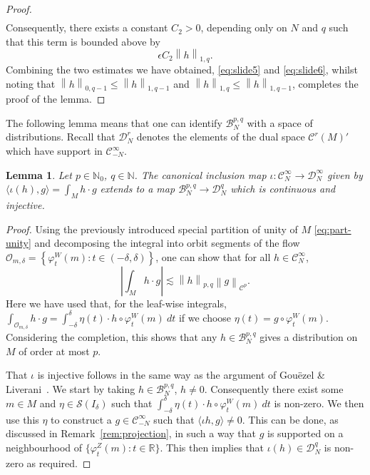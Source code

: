 \documentclass[a4paper,11pt]{amsart}
\newtheorem{lemma}[theorem]{Lemma}
\theoremstyle{remark}
\newcommand{\abs}[1]{\left|#1\right|} %
\newcommand{\cB}{\mathcal{B}} %
\newcommand{\cC}{\mathcal{C}} %
\newcommand{\cD}{\mathcal{D}} %
\newcommand{\cS}{\mathcal{S}} %
\newcommand{\bN}{\mathbb{N}} %
\newcommand{\bR}{\mathbb{R}} %
\newcommand{\norm}[1]{\left\|#1\right\|} %
\newcommand{\dw}{W} %
\newcommand{\dz}{Z} %
\begin{document}
\begin{proof}
\begin{multline*}
    \end{multline*}
    Consequently, there exists a constant \(C_2>0\), depending only on \(N\) and \(q\) such that this term is bounded above by
    \begin{equation}
        \label{eq:slide6}
        \epsilon C_2 \norm{h}_{1,q}.
    \end{equation}
    Combining the two estimates we have obtained, \eqref{eq:slide5} and \eqref{eq:slide6}, whilst noting that \(\norm{h}_{0,q-1} \leq \norm{h}_{1,q-1}\) and \(\norm{h}_{1,q} \leq \norm{h}_{1,q-1}\), completes the proof of the lemma.
\end{proof}

The following lemma means that one can identify \(\cB_{N}^{p,q}\) with a space of distributions. 
Recall that \(\cD_{N}^{r}\) denotes the elements of the dual space \({\cC^{r}(M)}'\) which have support in \(\cC_{-N}^{\infty}\).

\begin{lemma}
    \label{lem:distributions}
    Let \(p \in \bN_0\), \(q \in \bN\).
    The canonical inclusion map \(\iota:\cC^\infty_{N} \rightarrow \cD_{N}^{\infty}\) given by \(\langle \iota(h), g \rangle =  \int_{M} h \cdot g \) extends to a map \(\cB_{N}^{p,q} \to \cD_{N}^{q}\) which is continuous and injective.
\end{lemma}

\begin{proof}
    Using the previously introduced special partition of unity of \(M\) \eqref{eq:part-unity} and decomposing the integral into orbit segments of the flow \(\mathcal{O}_{m,\delta} = \left\{\varphi_t^\dw(m) : t\in (-\delta,\delta) \right\}\), one can show that for all \(h\in \cC_N^\infty\),
    \[
        \abs{\int_{M} h \cdot g} \lesssim \norm{h}_{p,q} \norm{g}_{\cC^p}.
    \]
    Here we have used that, for the leaf-wise integrals, \(\int_{\mathcal{O}_{m,\delta}}  h \cdot g = \int_{-\delta}^{\delta} \eta(t) \cdot h \circ \varphi^{\dw}_{t}(m)\ dt\) if we choose \(\eta(t) = g \circ \varphi^{\dw}_{t}(m)\).
    Considering the completion, this shows that any \(h \in \cB_{N}^{p,q}\) gives a distribution on \(M\) of order at most \(p\).
    
    That \(\iota\) is injective follows in the same way as the argument of Gouëzel \& Liverani~\cite[Proposition 4.1]{GL06}.
    We start by taking \(h \in \cB_{N}^{p,q}\), \(h\neq 0\).
    Consequently there exist some \(m\in M\) and \(\eta \in \cS(I_\delta)\) such that \(\int_{-\delta}^{\delta} \eta(t) \cdot h\circ\varphi_t^{\dw}(m)\ dt\) is non-zero.
    We then use this \(\eta\) to construct a \(g\in \cC^{\infty}_{-N}\) such that \(\langle \iota h, g\rangle \neq 0\).
    This can be done, as discussed in Remark~\ref{rem:projection}, in such a way that \(g\) is supported on a neighbourhood of \(\{\varphi^{\dz}_t(m): t\in \bR\}\). 
    This then implies that \(\iota (h) \in \cD_{N}^{q}\) is non-zero as required.
\end{proof}
\end{document}
